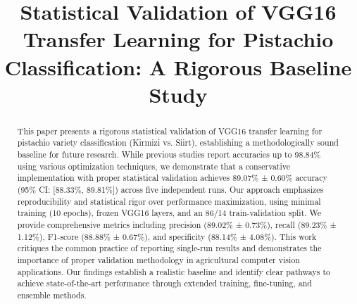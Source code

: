 \documentclass[conference]{IEEEtran}
\begin{document}
\title{Statistical Validation of VGG16 Transfer Learning for Pistachio Classification: A Rigorous Baseline Study\\
}

\author{
\and
{}
\and
{}
\and
{}
}

\maketitle

\begin{abstract}
This paper presents a rigorous statistical validation of VGG16 transfer learning for pistachio variety classification (Kirmizi vs. Siirt), establishing a methodologically sound baseline for future research. While previous studies report accuracies up to 98.84\% using various optimization techniques, we demonstrate that a conservative implementation with proper statistical validation achieves 89.07\% ± 0.60\% accuracy (95\% CI: [88.33\%, 89.81\%]) across five independent runs. Our approach emphasizes reproducibility and statistical rigor over performance maximization, using minimal training (10 epochs), frozen VGG16 layers, and an 86/14 train-validation split. We provide comprehensive metrics including precision (89.02\% ± 0.73\%), recall (89.23\% ± 1.12\%), F1-score (88.88\% ± 0.67\%), and specificity (88.14\% ± 4.08\%). This work critiques the common practice of reporting single-run results and demonstrates the importance of proper validation methodology in agricultural computer vision applications. Our findings establish a realistic baseline and identify clear pathways to achieve state-of-the-art performance through extended training, fine-tuning, and ensemble methods.
\end{abstract}
\end{document}
